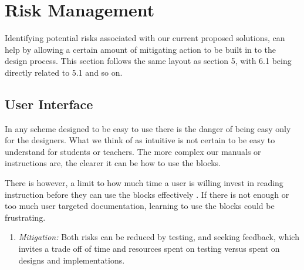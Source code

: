   \section{Risk Management}
  Identifying potential risks associated with our current proposed solutions, can help by allowing a certain amount of mitigating action to be built in to the design process. This section follows the same layout as section 5, with 6.1 being directly related to 5.1 and so on.
  \subsection{User Interface}
  In any scheme designed to be easy to use there is the danger of being easy only for the designers. What we think of as intuitive is not certain to be easy to understand for students or teachers. 
  The more complex our manuals or instructions are, the clearer it can be how to use the blocks.
  
   There is however,  a limit to how much time a  user is willing invest in reading instruction before they can use the blocks effectively . If there is not enough or too much user targeted documentation, learning to use the blocks could be frustrating.
  \begin{enumerate}
   \item \textit{Mitigation:} Both risks can be reduced by testing, and seeking feedback, which invites a trade off of time and resources spent on testing versus spent on designs and implementations. 
  \end{enumerate} 
   
 
